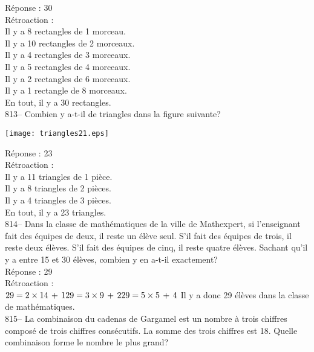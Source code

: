 ﻿\documentclass[letterpaper, 12pt]{article}
\begin{document}
R\'eponse : 30\\

R\'etroaction : \\
Il y a 8 rectangles de 1 morceau.\\
Il y a 10 rectangles de 2 morceaux.\\
Il y a 4 rectangles de 3 morceaux.\\
Il y a 5 rectangles de 4 morceaux.\\
Il y a 2 rectangles de 6 morceaux.\\
Il y a 1 rectangle de 8 morceaux.\\
En tout, il y a 30 rectangles.\\

813-- Combien y a-t-il de triangles dans la figure suivante?\\
    \begin{center}
    \texttt{[image: triangles21.eps]}
    \end{center}

R\'eponse : 23\\

R\'etroaction : \\
Il y a 11 triangles de 1 pi\`ece.\\
Il y a 8 triangles de 2 pi\`eces.\\
Il y a 4 triangles de 3 pi\`eces.\\
En tout, il y a 23 triangles.\\

814--  Dans la classe de math\'ematiques de la ville de  Mathexpert, si
l'enseignant fait des \'equipes de deux, il reste un \'el\`eve seul.  S'il
fait des \'equipes de trois, il reste deux \'el\`eves.  S'il fait des
\'equipes de cinq, il reste quatre \'el\`eves. Sachant qu'il y a entre 15 et
30 \'el\`eves, combien y en a-t-il exactement?\\

R\'eponse : 29\\

R\'etroaction : \\
$29=2\times14\,+\,1\\
29=3\times9\,+\,2\\
29=5\times5\,+\,4\\$
Il y a donc 29 \'el\`eves dans la classe de math\'ematiques.  \\

815-- La combinaison du cadenas de Gargamel est un nombre \`a trois chiffres
compos\'e de trois chiffres cons\'ecutifs.  La somme des trois chiffres est
18.  Quelle combinaison forme le nombre le plus grand?\\
\end{document}
